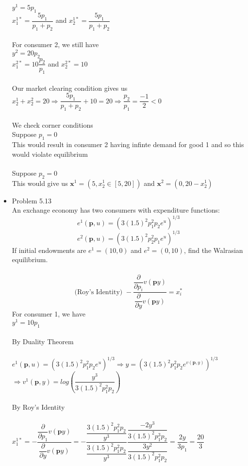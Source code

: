 \documentclass{article}
\begin{document}
\begin{itemize}
    $y^1=5p_1$\\
    $x_1^{1*}=\dfrac{5p_1}{p_1+p_2}$ and $x_2^{1*}=\dfrac{5p_1}{p_1+p_2}$\\\\
    For consumer 2, we still have\\
    $y^2=20p_2$\\
    $x_1^{2*}=10\dfrac{p_2}{p_1}$ and $x_2^{2*}=10$\\\\
    Our market clearing condition gives us\\
    $x_2^1+x_2^2=20\Rightarrow \dfrac{5p_1}{p_1+p_2}+10=20\Rightarrow\dfrac{p_2}{p_1}=\dfrac{-1}{2}<0$\\\\
    We check corner conditions\\
    Suppose $p_1=0$\\
    This would result in consumer 2 having infinte demand for good 1 and so this would violate equilibrium\\\\
    Suppose $p_2=0$\\
    This would give us $\textbf{x}^1=(5,x_2^1\in[5,20])$ and $\textbf{x}^2=(0,20-x_2^1)$
    \pagebreak
    \item Problem 5.13\\
    An exchange economy has two consumers with expenditure functions:
    $$e^1(\textbf{p},u)=(3(1.5)^2p_1^2p_2e^u)^{1/3}$$
    $$e^2(\textbf{p},u)=(3(1.5)^2p_2^2p_1e^u)^{1/3}$$
    If initial endowments are $e^1=(10,0)$ and $e^2=(0,10)$, find the Walrasian equilibrium.\\\\
    $$\text{(Roy's Identity) }-\dfrac{\dfrac{\partial}{\partial p_i}v(\textbf{p}y)}{\dfrac{\partial}{\partial y}v(\textbf{p}y)}=x_i^*$$
    For consumer 1, we have\\
    $y^1=10p_1$\\\\
    By Duality Theorem\\\\
    $e^1(\textbf{p},u)=(3(1.5)^2p_1^2p_2e^u)^{1/3}\Rightarrow y=(3(1.5)^2p_1^2p_2e^{v(\textbf{p},y)})^{1/3}$\\
    $\Rightarrow v^1(\textbf{p},y)=log(\dfrac{y^3}{3(1.5)^2p_1^2p_2})$\\\\
    By Roy's Identity\\\\
    $x_1^{1*}=-\dfrac{\dfrac{\partial}{\partial p_1}v(\textbf{p}y)}{\dfrac{\partial}{\partial y}v(\textbf{p}y)}=-\dfrac{\dfrac{3(1.5)^2p_1^2p_2}{y^3}}{\dfrac{3(1.5)^2p_1^2p_2}{y^3}}\dfrac{\dfrac{-2y^3}{3(1.5)^2p_1^3p_2}}{\dfrac{3y^2}{3(1.5)^2p_1^2p_2}}=\dfrac{2y}{3p_1}=\dfrac{20}{3}$\\

\end{itemize}
\end{document}
